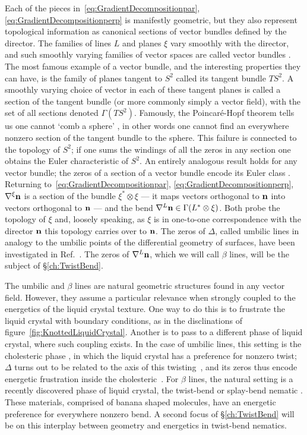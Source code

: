 Each of the pieces in~\eqref{eq:GradientDecompositionpar}, \eqref{eq:GradientDecompositionperp} is manifestly geometric, but they also represent topological information as canonical sections of vector bundles defined by the director. The families of lines $L$ and planes $\xi$ vary smoothly with the director, and such smoothly varying families of vector spaces are called vector bundles \citep{TuBook,MilnorStasheffBook}. The most famous example of a vector bundle, and the interesting properties they can have, is the family of planes tangent to $S^2$ called its tangent bundle $T S^2$. A smoothly varying choice of vector in each of these tangent planes is called a section of the tangent bundle (or more commonly simply a vector field), with the set of all sections denoted $\Gamma (TS^2)$. Famously, the Poincar\'e-Hopf theorem tells us one cannot `comb a sphere' \citep{Milnor1997}, in other words one cannot find an everywhere nonzero section of the tangent bundle to the sphere. This failure is connected to the topology of $S^2$; if one sums the windings of all the zeros in any section one obtains the Euler characteristic of $S^2$. An entirely analogous result holds for any vector bundle; the zeros of a section of a vector bundle encode its Euler class \citep{BottTuBook, MilnorStasheffBook}. Returning to~\eqref{eq:GradientDecompositionpar}, \eqref{eq:GradientDecompositionperp}, $\nabla^\xi \bf n $ is a section of the bundle $\xi^* \otimes \xi$ --- it maps vectors orthogonal to $\bf n$ into vectors orthogonal to $\bf n$ --- and the bend $\nabla^L {\bf n} \in \Gamma (L^* \otimes \xi)$. Both probe the topology of $\xi$ and, loosely speaking, as $\xi$ is in one-to-one correspondence with the director $\bf n$ this topology carries over to $\bf n$. The zeros of $\Delta$, called umbilic lines in analogy to the umbilic points of the differential geometry of surfaces, have been investigated in Ref.~\citep{Machon2016b}. The zeros of $\nabla^L \bf n$, which we will call $\beta$ lines, will be the subject of \S\ref{ch:TwistBend}.

The umbilic and $\beta$ lines are natural geometric structures found in any vector field. However, they assume a particular relevance when strongly coupled to the energetics of the liquid crystal texture. One way to do this is to frustrate the liquid crystal with boundary conditions, as in the disclinations of figure~\ref{fig:KnottedLiquidCrystal}. Another is to pass to a different phase of liquid crystal, where such coupling exists. In the case of umbilic lines, this setting is the cholesteric phase \citep{Bellar2014}, in which the liquid crystal has a preference for nonzero twist; $\Delta$ turns out to be related to the axis of this twisting~\citep{MachonThesis, AlexanderBook}, and its zeros thus encode energetic frustration inside the cholesteric~\citep{Machon2016b}. For $\beta$ lines, the natural setting is a recently discovered phase of liquid crystal, the twist-bend or splay-bend nematic \citep{Cestari2011,Chen2013,Borshch2013,Lavrentovich2018}. These materials, comprised of banana shaped molecules, have an energetic preference for everywhere nonzero bend. A second focus of \S\ref{ch:TwistBend} will be on this interplay between geometry and energetics in twist-bend nematics. 

